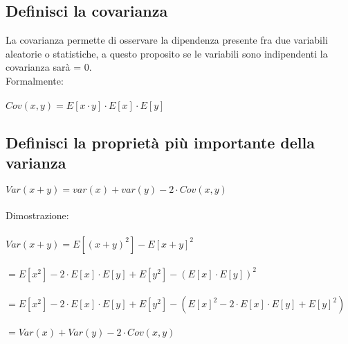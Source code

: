 \documentclass[a4paper,12pt]{report}
\begin{document}
	\subsection{Definisci la covarianza}
	La covarianza permette di osservare la dipendenza presente fra due variabili aleatorie o statistiche, a questo proposito se le variabili sono indipendenti la covarianza sarà = 0. \\
	Formalmente: \\\\
	$Cov(x, y) = E[x \cdot y] \cdot E[x]\cdot E[y]$
	
	\subsection{Definisci la proprietà più importante della varianza}
	$Var(x + y) = var(x) + var(y) - 2 \cdot Cov(x, y)$ \\\\
	Dimostrazione:\\\\
	$Var(x + y) = E[(x + y)^2] - E[x + y]^2$ \\\\
	$ = E[x^2] - 2\cdot E[x] \cdot E[y] + E[y^2] - (E[x] \cdot E[y])^2$ \\ \\ 
	$ = E[x^2] - 2\cdot E[x] \cdot E[y] + E[y^2] -  (E[x]^2 - 2 \cdot E[x] \cdot E[y] + E[y]^2)$ \\\\
	$ = Var(x) + Var(y) - 2 \cdot Cov(x, y)$
	
\end{document}
